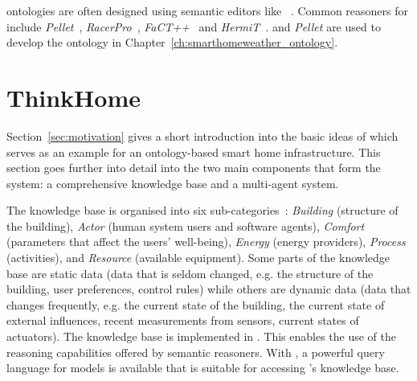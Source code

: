  ontologies are often designed using semantic editors like \protege~\cite{protege}. Common reasoners for  include \emph{Pellet}~\cite{pellet}, \emph{RacerPro}~\cite{RacerPro}, \emph{FaCT++}~\cite{factplusplus} and \emph{HermiT}~\cite{hermit}. \protege and \emph{Pellet} are used to develop the \smarthomeweather ontology in Chapter~\ref{ch:smarthomeweather_ontology}.

\section{ThinkHome}

Section~\ref{sec:motivation} gives a short introduction into the basic ideas of \thinkhome which serves as an example for an ontology-based smart home infrastructure. This section goes further into detail into the two main components that form the \thinkhome system: a comprehensive knowledge base and a multi-agent system.

The knowledge base is organised into six sub-categories~\cite{CR2011-TH_Journal,CR2010-DEST_ThinkHome}: \emph{Building} (structure of the building), \emph{Actor} (human system users and software agents), \emph{Comfort} (parameters that affect the users' well-being), \emph{Energy} (energy providers), \emph{Process} (activities), and \emph{Resource} (available equipment). Some parts of the knowledge base are static data (data that is seldom changed, e.g. the structure of the building, user preferences, control rules) while others are dynamic data (data that changes frequently, e.g. the current state of the building, the current state of external influences, recent measurements from sensors, current states of actuators). The knowledge base is implemented in . This enables the use of the reasoning capabilities offered by semantic reasoners. With , a powerful query language for  models is available that is suitable for accessing \thinkhome's knowledge base.

